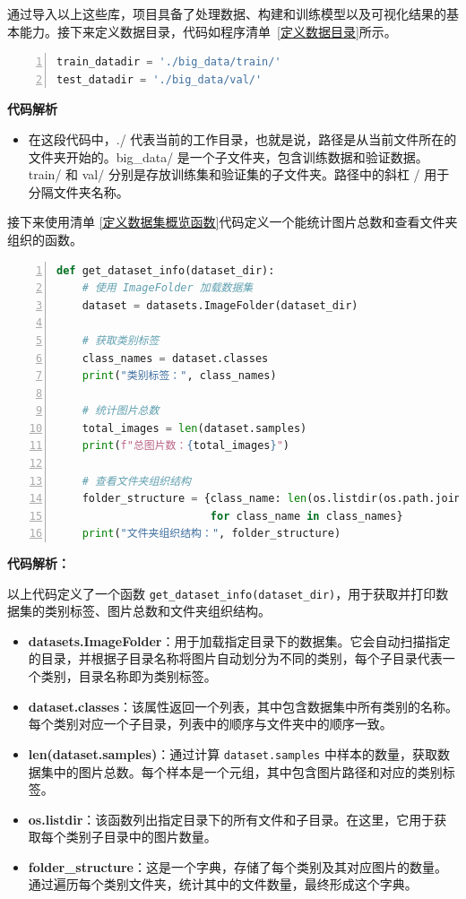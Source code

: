 通过导入以上这些库，项目具备了处理数据、构建和训练模型以及可视化结果的基本能力。接下来定义数据目录，代码如程序清单~\ref{定义数据目录}所示。

\begin{lstlisting}[language={python},label={定义数据目录},caption={定义数据目录}, basicstyle=\footnotesize\ttfamily, breaklines=true, numbers=left, frame=single,keepspaces=true,showstringspaces=false]
train_datadir = './big_data/train/'
test_datadir = './big_data/val/'
\end{lstlisting}
\textbf{代码解析}
\begin{itemize}
    \item 在这段代码中，./ 代表当前的工作目录，也就是说，路径是从当前文件所在的文件夹开始的。big\_data/ 是一个子文件夹，包含训练数据和验证数据。train/ 和 val/ 分别是存放训练集和验证集的子文件夹。路径中的斜杠 / 用于分隔文件夹名称。
\end{itemize}


接下来使用清单 \ref{定义数据集概览函数}代码定义一个能统计图片总数和查看文件夹组织的函数。
\begin{lstlisting}[language={python},label={定义数据集概览函数},caption={定义数据集概览函数}, basicstyle=\footnotesize\ttfamily, breaklines=true, numbers=left, frame=single]
def get_dataset_info(dataset_dir):
    # 使用 ImageFolder 加载数据集
    dataset = datasets.ImageFolder(dataset_dir)
    
    # 获取类别标签
    class_names = dataset.classes
    print("类别标签：", class_names)

    # 统计图片总数
    total_images = len(dataset.samples)
    print(f"总图片数：{total_images}")

    # 查看文件夹组织结构
    folder_structure = {class_name: len(os.listdir(os.path.join(dataset_dir, class_name))) 
                        for class_name in class_names}
    print("文件夹组织结构：", folder_structure)
\end{lstlisting}
\textbf{代码解析：}

以上代码定义了一个函数 \texttt{get\_dataset\_info(dataset\_dir)}，用于获取并打印数据集的类别标签、图片总数和文件夹组织结构。
\begin{itemize}
    \item \textbf{datasets.ImageFolder}：用于加载指定目录下的数据集。它会自动扫描指定的目录，并根据子目录名称将图片自动划分为不同的类别，每个子目录代表一个类别，目录名称即为类别标签。
    \item \textbf{dataset.classes}：该属性返回一个列表，其中包含数据集中所有类别的名称。每个类别对应一个子目录，列表中的顺序与文件夹中的顺序一致。
    \item \textbf{len(dataset.samples)}：通过计算 \texttt{dataset.samples} 中样本的数量，获取数据集中的图片总数。每个样本是一个元组，其中包含图片路径和对应的类别标签。
    \item \textbf{os.listdir}：该函数列出指定目录下的所有文件和子目录。在这里，它用于获取每个类别子目录中的图片数量。
    \item \textbf{folder\_structure}：这是一个字典，存储了每个类别及其对应图片的数量。通过遍历每个类别文件夹，统计其中的文件数量，最终形成这个字典。
\end{itemize}

